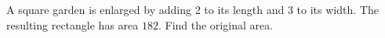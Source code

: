 A square garden is enlarged by adding $2$ to its length and $3$ to its width. The resulting rectangle has area $182$. Find the original area.
